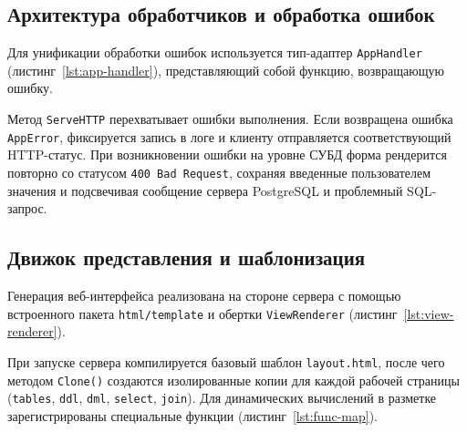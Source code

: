 \subsection{Архитектура обработчиков и обработка ошибок}

Для унификации обработки ошибок используется тип-адаптер \texttt{AppHandler} (листинг~\ref{lst:app-handler}), представляющий собой функцию, возвращающую ошибку.

\begin{listing}[H]
    \caption{Структура \texttt{AppError} и адаптер обработчиков \texttt{AppHandler}}
    \label{lst:app-handler}
\end{listing}

Метод \texttt{ServeHTTP} перехватывает ошибки выполнения. Если возвращена ошибка \texttt{AppError}, фиксируется запись в логе и клиенту отправляется соответствующий HTTP-статус. При возникновении ошибки на уровне СУБД форма рендерится повторно со статусом \texttt{400 Bad Request}, сохраняя введенные пользователем значения и подсвечивая сообщение сервера PostgreSQL и проблемный SQL-запрос.

\subsection{Движок представления и шаблонизация}

Генерация веб-интерфейса реализована на стороне сервера с помощью встроенного пакета \texttt{html/template} и обертки \texttt{ViewRenderer} (листинг~\ref{lst:view-renderer}).

\begin{listing}[H]
    \caption{Инициализация и рендеринг шаблонов в \texttt{views.go}}
    \label{lst:view-renderer}
\end{listing}

При запуске сервера компилируется базовый шаблон \texttt{layout.html}, после чего методом \texttt{Clone()} создаются изолированные копии для каждой рабочей страницы (\texttt{tables}, \texttt{ddl}, \texttt{dml}, \texttt{select}, \texttt{join}). Для динамических вычислений в разметке зарегистрированы специальные функции (листинг~\ref{lst:func-map}).

\begin{listing}[H]
    \caption{Пользовательские функции шаблонизатора \texttt{funcMap}}
    \label{lst:func-map}
\end{listing}

